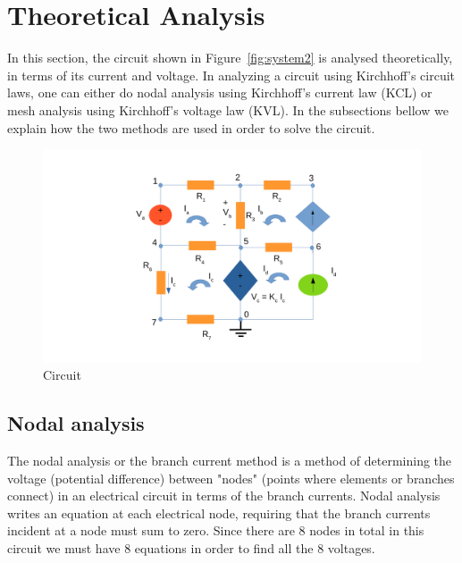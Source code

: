 \section{Theoretical Analysis}
\label{sec:analysis}

In this section, the circuit shown in Figure~\ref{fig:system2} is analysed
theoretically, in terms of its current and voltage.
In analyzing a circuit using Kirchhoff's circuit laws, one can either do nodal analysis using Kirchhoff's current law (KCL) or mesh analysis using Kirchhoff's voltage law (KVL).
In the subsections bellow we explain how the two methods are used in order to solve the circuit. 

\begin{figure}[ht]
\centering
\includegraphics[width = 15cm]{system2.pdf}
\caption {Circuit}
\end{figure}


\subsection{Nodal analysis}
The nodal analysis or the branch current method is a method of determining the voltage (potential difference) between "nodes" (points where elements or branches connect) in an electrical circuit in terms of the branch currents. 
Nodal analysis writes an equation at each electrical node, requiring that the branch currents incident at a node must sum to zero.
Since there are 8 nodes in total in this circuit we must have 8 equations in order to find all the 8 voltages.



